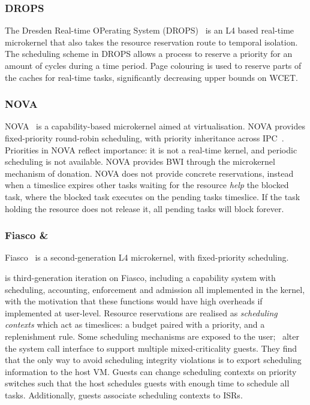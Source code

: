 \subsubsection{DROPS}

The Dresden Real-time OPerating System (DROPS)~\citep{Haertig_BBHHMRSW_98} is an L4 based
real-time microkernel that also takes the resource reservation route to temporal isolation.  The
scheduling scheme in DROPS allows a process to reserve a priority for an amount of cycles during a
time period.  Page colouring is used to reserve parts of the caches for real-time tasks,
significantly decreasing upper bounds on \gls{WCET}.

\subsubsection{NOVA}

NOVA~\citep{Steinberg_Kauer_10} is a capability-based microkernel aimed at virtualisation. 
NOVA provides fixed-priority round-robin scheduling, with priority inheritance across IPC~\citep{Steinberg_BK_10}.
Priorities in NOVA reflect importance: it is not a real-time kernel, and periodic scheduling is not available.  
NOVA provides \gls{BWI} through the microkernel mechanism of donation. NOVA does not
provide concrete reservations, instead when a timeslice expires other tasks waiting for the resource
\emph{help} the blocked task, where the blocked task executes on the pending tasks timeslice.
If the task holding the resource does not release it, all pending tasks will block forever.


\subsubsection{Fiasco \& \fiascooc}

Fiasco~\citep{Hohmuth_02} is a second-generation L4 microkernel, with fixed-priority scheduling.

\citet{FiascoOC:URL} is third-generation iteration on Fiasco, including a capability system 
with scheduling, accounting, enforcement and admission
all implemented in the kernel, with the motivation that these functions would have high
overheads if implemented at user-level.  Resource reservations are realised as \emph{scheduling
contexts} which act as timeslices: a budget paired with a priority, and a replenishment rule.  Some
scheduling mechanisms are exposed to the user;~\citet{Lackorzynski_WVH_12} alter the system call
interface to support multiple mixed-criticality guests.  They find that the only way to avoid
scheduling integrity violations is to export scheduling information to the host \gls{VM}.  Guests
can change scheduling contexts on priority switches such that the host schedules guests with enough
time to schedule all tasks.  Additionally, guests associate scheduling contexts to \glspl{ISR}.


